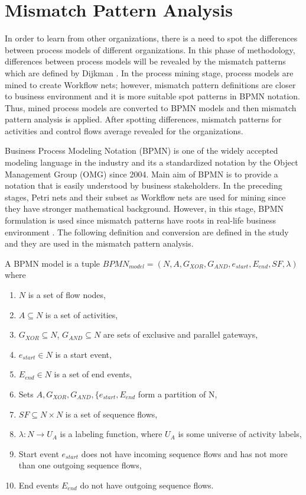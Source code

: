 \section{Mismatch Pattern Analysis}
\label{sec:mismatch-pattern-analysis}
In order to learn from other organizations, there is a need to spot the differences between process models of different organizations. In this phase of methodology, differences between process models will be revealed by the mismatch patterns which are defined by Dijkman \cite{dijkman2007mismatch}. In the process mining stage, process models are mined to create Workflow nets; however, mismatch pattern definitions are closer to business environment and it is more suitable spot patterns in BPMN notation. Thus, mined process models are converted to BPMN models and then mismatch pattern analysis is applied. After spotting differences, mismatch patterns for activities and control flows average revealed for the organizations.

Business Process Modeling Notation (BPMN) is one of the widely accepted modeling language in the industry and its a standardized notation by the Object Management Group (OMG) since 2004. Main aim of BPMN is to provide a notation that is easily understood by business stakeholders. In the preceding stages, Petri nets and their subset as Workflow nets are used for mining since they have stronger mathematical background. However, in this stage, BPMN formulation is used since mismatch patterns have roots in real-life business environment \cite{dijkman2007mismatch}. The following definition and conversion are defined in the study \cite{kalenkovaprocess} and they are used in the mismatch pattern analysis. 

\theoremstyle{definition}
\begin{definition}
A BPMN model is a tuple $BPMN_{model}=(N, A, G_{XOR}, G_{AND}, e_{start}, E_{end}, SF, \lambda)$ where
\begin{enumerate}
  \item $N$ is a set of flow nodes,
  \item $A \subseteq N$ is a set of activities,
  \item $G_{XOR} \subseteq N$, $G_{AND} \subseteq N$ are sets of exclusive and parallel gateways,
  \item $e_{start} \in N$ is a start event,
  \item $E_{end} \in N$ is a set of end events,
  \item Sets $A, G_{XOR}, G_{AND}, \{e_{start}, E_{end}$ form a partition of N,
  \item $SF \subseteq N \times N$ is a set of sequence flows,
  \item $\lambda : N \rightarrow U_{A}$ is a labeling function, where $U_{A}$ is some universe of activity labels,
  \item Start event $e_{start}$ does not have incoming sequence flows and has not more than one outgoing sequence flows,
  \item End events $E_{end}$ do not have outgoing sequence flows.  
\end{enumerate}
\end{definition}

